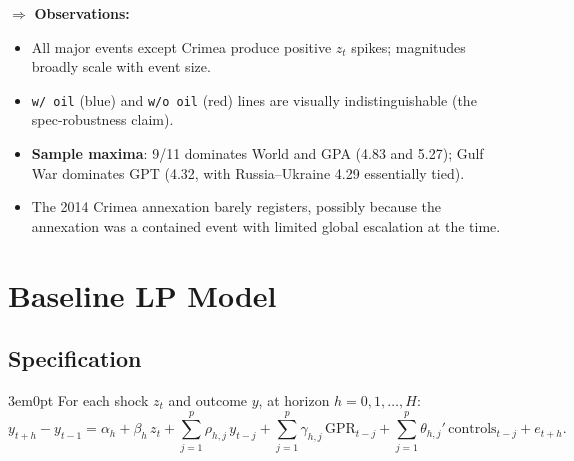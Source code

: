 \documentclass[12pt]{article}
\newenvironment{bodyL2}{\begin{adjustwidth}{3em}{0pt}}{\end{adjustwidth}}
\begin{document}
\smallskip
$\Rightarrow$ \textbf{Observations:}
\begin{itemize}
    \item All major events except Crimea produce positive $z_t$ spikes; magnitudes broadly scale with event size.
    \item \texttt{w/ oil} (blue) and \texttt{w/o oil} (red) lines are visually indistinguishable (the spec-robustness claim).
    \item \textbf{Sample maxima}: 9/11 dominates World and GPA (4.83 and 5.27); Gulf War dominates GPT (4.32, with Russia--Ukraine 4.29 essentially tied).
    \item The 2014 Crimea annexation barely registers, possibly because the annexation was a contained event with limited global escalation at the time.
\end{itemize}

\begin{center}
\end{center}


\section{Baseline LP Model}
\label{sec:lp}

\subsection{Specification}
\begin{bodyL2}
For each shock $z_t$ and outcome $y$, at horizon $h = 0, 1, \ldots, H$:
\begin{equation}
    y_{t+h} - y_{t-1}
    = \alpha_h
    + \beta_h\, z_t
    + \sum_{j=1}^{p} \rho_{h,j}\, y_{t-j}
    + \sum_{j=1}^{p} \gamma_{h,j}\, \text{GPR}_{t-j}
    + \sum_{j=1}^{p} \theta_{h,j}'\, \text{controls}_{t-j}
    + e_{t+h}.
    \label{eq:lp}
\end{equation}
\end{bodyL2}
\end{document}
